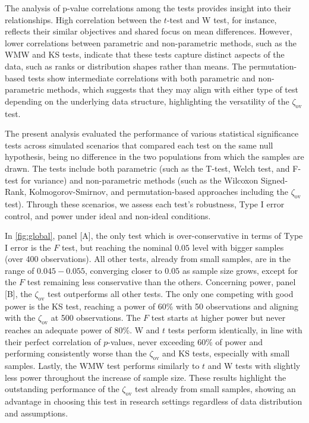 \documentclass[twocolumn]{article}\usepackage[]{graphicx}\usepackage[]{xcolor}
\begin{document}
The analysis of p-value correlations among the tests provides insight into their relationships. High correlation between the $t$-test and W test, for instance, reflects their similar objectives and shared focus on mean differences. However, lower correlations between parametric and non-parametric methods, such as the WMW and KS tests, indicate that these tests capture distinct aspects of the data, such as ranks or distribution shapes rather than means. The permutation-based tests show intermediate correlations with both parametric and non-parametric methods, which suggests that they may align with either type of test depending on the underlying data structure, highlighting the versatility of the $\zeta_{\mbox{ov}}$ test.


The present analysis evaluated the performance of various statistical significance tests across simulated scenarios that compared each test on the same null hypothesis, being no difference in the two populations from which the samples are drawn. The tests include both parametric (such as the T-test, Welch test, and F-test for variance) and non-parametric methods (such as the Wilcoxon Signed-Rank, Kolmogorov-Smirnov, and permutation-based approaches including the $\zeta_{\mbox{ov}}$ test). Through these scenarios, we assess each test's robustness, Type I error control, and power under ideal and non-ideal conditions.

In \ref{fig:global}, panel [A], the only test which is over-conservative in terms of Type I error is the $F$ test, but reaching the nominal $0.05$ level with bigger samples (over 400 observations). All other tests, already from small samples, are in the range of $0.045 - 0.055$, converging closer to $0.05$ as sample size grows, except for the $F$ test remaining less conservative than the others. Concerning power, panel [B], the $\zeta_{\mbox{ov}}$ test outperforms all other tests. The only one competing with good power is the KS test, reaching a power of 60\% with 50 observations and aligning with the $\zeta_{\mbox{ov}}$ at 500 observations. The $F$ test starts at higher power but never reaches an adequate power of 80\%. W and $t$ tests perform identically, in line with their perfect correlation of $p$-values, never exceeding 60\% of power and performing consistently worse than the $\zeta_{\mbox{ov}}$ and KS tests, especially with small samples. Lastly, the WMW test performs similarly to $t$ and W tests with slightly less power throughout the increase of sample size. These results highlight the outstanding performance of the $\zeta_{\mbox{ov}}$ test already from small samples, showing an advantage in choosing this test in research settings regardless of data distribution and assumptions.
\end{document}
